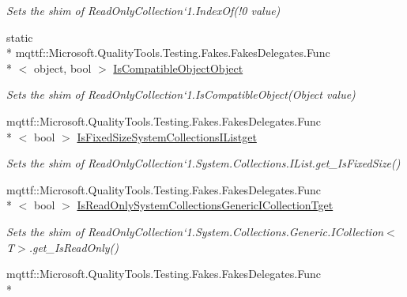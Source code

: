 \begin{DoxyCompactItemize}
\begin{DoxyCompactList}\small\item\em Sets the shim of Read\-Only\-Collection`1.Index\-Of(!0 value)\end{DoxyCompactList}\item 
static \\*
mqttf\-::\-Microsoft.\-Quality\-Tools.\-Testing.\-Fakes.\-Fakes\-Delegates.\-Func\\*
$<$ object, bool $>$ \hyperlink{class_system_1_1_collections_1_1_object_model_1_1_fakes_1_1_shim_read_only_collection_3_01_t_01_4_a219d46baf665ed348f648f5b631ae044}{Is\-Compatible\-Object\-Object}
\begin{DoxyCompactList}\small\item\em Sets the shim of Read\-Only\-Collection`1.Is\-Compatible\-Object(\-Object value)\end{DoxyCompactList}\item 
mqttf\-::\-Microsoft.\-Quality\-Tools.\-Testing.\-Fakes.\-Fakes\-Delegates.\-Func\\*
$<$ bool $>$ \hyperlink{class_system_1_1_collections_1_1_object_model_1_1_fakes_1_1_shim_read_only_collection_3_01_t_01_4_a0ae27669ac07b1ce31a4b7bbb897b35f}{Is\-Fixed\-Size\-System\-Collections\-I\-Listget}
\begin{DoxyCompactList}\small\item\em Sets the shim of Read\-Only\-Collection`1.System.\-Collections.\-I\-List.\-get\-\_\-\-Is\-Fixed\-Size()\end{DoxyCompactList}\item 
mqttf\-::\-Microsoft.\-Quality\-Tools.\-Testing.\-Fakes.\-Fakes\-Delegates.\-Func\\*
$<$ bool $>$ \hyperlink{class_system_1_1_collections_1_1_object_model_1_1_fakes_1_1_shim_read_only_collection_3_01_t_01_4_ad4e0a020d47f64ffac910ab14c6b6cbb}{Is\-Read\-Only\-System\-Collections\-Generic\-I\-Collection\-Tget}
\begin{DoxyCompactList}\small\item\em Sets the shim of Read\-Only\-Collection`1.System.\-Collections.\-Generic.\-I\-Collection$<$T$>$.get\-\_\-\-Is\-Read\-Only()\end{DoxyCompactList}\item 
mqttf\-::\-Microsoft.\-Quality\-Tools.\-Testing.\-Fakes.\-Fakes\-Delegates.\-Func\\*

\end{DoxyCompactItemize}
